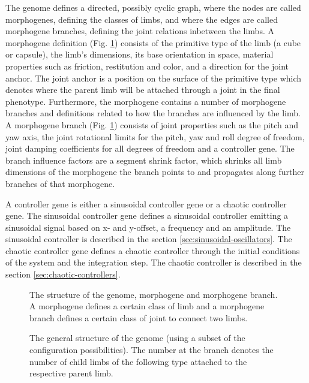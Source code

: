 \documentclass[main]{subfiles}
\begin{document}
The genome defines a directed, possibly cyclic graph, where the nodes are called morphogenes, defining the classes of limbs, and where the edges are called morphogene branches, defining the joint relations inbetween the limbs. A morphogene definition (Fig. \ref{figure:genome-structure}) consists of the primitive type of the limb (a cube or capsule), the limb's dimensions, its base orientation in space, material properties such as friction, restitution and color, and a direction for the joint anchor. The joint anchor is a position on the surface of the primitive type which denotes where the parent limb will be attached through a joint in the final phenotype. Furthermore, the morphogene contains a number of morphogene branches and definitions related to how the branches are influenced by the limb. \\

A morphogene branch (Fig. \ref{figure:genome-structure}) consists of joint properties such as the pitch and yaw axis, the joint rotational limits for the pitch, yaw and roll degree of freedom, joint damping coefficients for all degrees of freedom and a controller gene.
The branch influence factors are a segment shrink factor, which shrinks all limb dimensions of the morphogene the branch points to and propagates along further branches of that morphogene.

A controller gene is either a sinusoidal controller gene or a chaotic controller gene.  The sinusoidal controller gene defines a sinusoidal controller emitting a sinusoidal signal based on x- and y-offset, a frequency and an amplitude. The sinusoidal controller is described in the section \ref{sec:sinusoidal-oscillators}. The chaotic controller gene defines a chaotic controller through the initial conditions of the system and the integration step. The chaotic controller is described in the section \ref{sec:chaotic-controllers}.

\begin{figure}[H]
\center


\caption[Indirectly encoded genome structure]{The structure of the genome, morphogene and morphogene branch. A morphogene defines a certain class of limb and a morphogene branch defines a certain class of joint to connect two limbs.}
\label{figure:genome-structure}
\end{figure}

\begin{figure}[H]
\center


\caption[Possible indirectly encoded genome]{The general structure of the genome (using a subset of the configuration possibilities). The number at the branch denotes the number of child limbs of the following type attached to the respective parent limb.}
\label{figure:indirect-genotype}
\end{figure}
\end{document}
